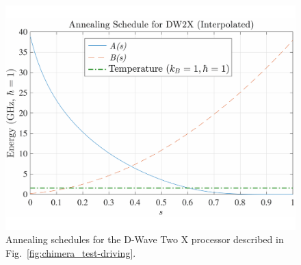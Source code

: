   \begin{figure}[t]
  \centering
   \includegraphics[width=0.9\columnwidth]{chapters/Test-driving/AnnealingSchedule.pdf}
   \caption{Annealing schedules for the D-Wave Two X processor described in Fig.~\ref{fig:chimera_test-driving}.}
   \label{fig:schedule_test-driving}
   \end{figure}

